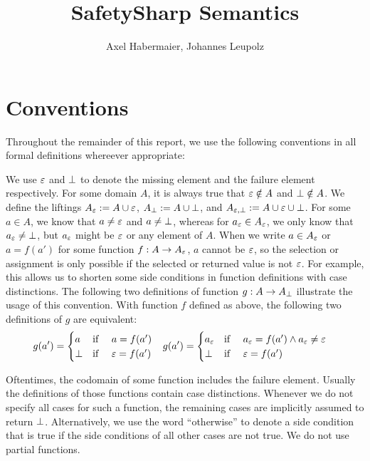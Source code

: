 \documentclass{article}
\title{SafetySharp Semantics}
\author{Axel Habermaier, Johannes Leupolz}
\begin{document}
\maketitle

\section{Conventions}
Throughout the remainder of this report, we use the following conventions in all formal definitions whereever appropriate:

	We use $\varepsilon$ and $\bot$ to denote the missing element and the failure element respectively. For some domain $A$, it is
	always true that $\varepsilon \notin A$ and $\bot \notin A$. We define the liftings $A_\varepsilon := A \cup
	\varepsilon$, $A_\bot := A \cup \bot$, and $A_{\varepsilon, \bot} := A \cup \varepsilon \cup	\bot$.
	For some $a \in A$, we know that $a \neq \varepsilon$ and $a \neq \bot$, whereas for $a_\varepsilon \in
	A_\varepsilon$, we only know that $a_\varepsilon \neq \bot$, but $a_\varepsilon$ might be $\varepsilon$ or
	any element of $A$. When we write $a \in A_\varepsilon$ or $a = f(a')$ for some function $f : A \rightarrow
	A_\varepsilon$, $a$ cannot be $\varepsilon$, so the selection or assignment is only possible if the selected or
	returned value is not $\varepsilon$. For example, this allows us to shorten some side conditions in function definitions with case
	distinctions. The following two definitions of function $g : A \rightarrow A_\bot$ illustrate the usage of this
	convention.
	With function $f$ defined as above, the following two definitions of $g$ are equivalent:
	\begin{align*}
		g(a') = \begin{cases}
			a & \text{if } \quad a = f(a') \\
			\bot & \text{if } \quad \varepsilon = f(a')
		\end{cases}
		&&&
		g(a') = \begin{cases}
			a_\varepsilon & \text{if } \quad a_\varepsilon = f(a') \wedge a_\varepsilon \neq \varepsilon	\\
			\bot & \text{if } \quad \varepsilon = f(a')
		\end{cases}
	\end{align*}

	Oftentimes, the codomain of some function includes the failure element. Usually the definitions of those functions contain case distinctions.
	Whenever we do not specify all cases for such a function, the remaining cases are implicitly assumed to return $\bot$.
	Alternatively, we use the word ``otherwise'' to denote a side condition that is true if the side conditions of all other cases are not true. We do not use partial functions.
\end{document}
